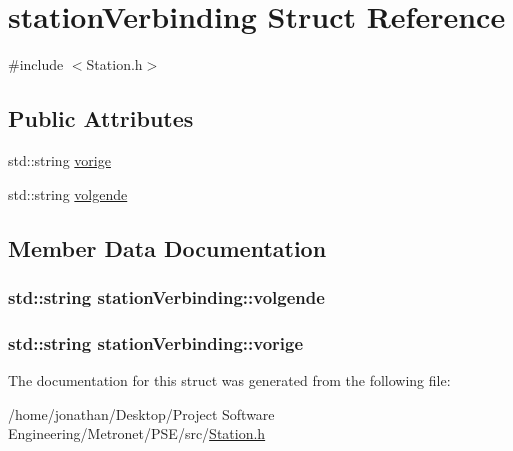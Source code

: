 \hypertarget{structstation_verbinding}{}\section{station\+Verbinding Struct Reference}
\label{structstation_verbinding}


{\ttfamily \#include $<$Station.\+h$>$}

\subsection*{Public Attributes}
\begin{DoxyCompactItemize}
\item 
std\+::string \hyperlink{structstation_verbinding_af8d9993c5e316f93a90acd12dd12604a}{vorige}
\item 
std\+::string \hyperlink{structstation_verbinding_a628e06180645500c27364c1c4c7e92ef}{volgende}
\end{DoxyCompactItemize}


\subsection{Member Data Documentation}
\subsubsection[{\texorpdfstring{volgende}{volgende}}]{\setlength{\rightskip}{0pt plus 5cm}std\+::string station\+Verbinding\+::volgende}\hypertarget{structstation_verbinding_a628e06180645500c27364c1c4c7e92ef}{}\label{structstation_verbinding_a628e06180645500c27364c1c4c7e92ef}
\subsubsection[{\texorpdfstring{vorige}{vorige}}]{\setlength{\rightskip}{0pt plus 5cm}std\+::string station\+Verbinding\+::vorige}\hypertarget{structstation_verbinding_af8d9993c5e316f93a90acd12dd12604a}{}\label{structstation_verbinding_af8d9993c5e316f93a90acd12dd12604a}


The documentation for this struct was generated from the following file\+:\begin{DoxyCompactItemize}
\item 
/home/jonathan/\+Desktop/\+Project Software Engineering/\+Metronet/\+P\+S\+E/src/\hyperlink{_station_8h}{Station.\+h}\end{DoxyCompactItemize}
